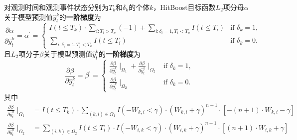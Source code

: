 \begin{theorem}\label{thm:1.3}
对观测时间和观测事件状态分别为$T_k$和$\delta_k$的个体$k$，HitBoost目标函数$L_2$项分母$\alpha$关于模型预测值$\hat{y}_t^k$的\textbf{一阶梯度}为$$
\frac{\partial \alpha}{\partial \hat{y}_t^k}=\alpha^{'}=
\begin{cases}
I(t\le T_k)\cdot {\sum\limits_{i: T_i>T_k}(-1)} + \sum\limits_{i: \delta_i=1,T_i<T_k} I(t\le T_i) & \text{if } \delta_k = 1,\\
\sum\limits_{i: \delta_i=1,T_i<T_k} I(t\le T_i) & \text{if } \delta_k = 0.
\end{cases}
$$ 且$L_2$项分子$\beta$关于模型预测值$\hat{y}_t^k$的\textbf{一阶梯度}为$$
\frac{\partial \beta}{\partial \hat{y}_t^k}=\beta^{'}=
\begin{cases}
\frac{\partial \beta}{\partial \hat{y}_t^k} \mid_{\Omega_1} + \frac{\partial \beta}{\partial \hat{y}_t^k} \mid_{\Omega_2} & \text{if } \delta_k = 1,\\
\frac{\partial \beta}{\partial \hat{y}_t^k} \mid_{\Omega_2} & \text{if } \delta_k = 0.
\end{cases}
$$ 其中\[
\begin{split}
\frac{\partial \beta}{\partial \hat{y}_t^k} \mid_{\Omega_1} &= I(t\le T_k)\cdot \sum\limits_{(k,i)\in \Omega_1} {I(-W_{k,i}<\gamma)\cdot (W_{k,i}+\gamma)^{n-1}\cdot [-(n+1)\cdot W_{k,i}-\gamma]} \\
\frac{\partial \beta}{\partial \hat{y}_t^k} \mid_{\Omega_2} &= \sum\limits_{(i,k)\in \Omega_2} {I(t\le T_i)\cdot I(-W_{i,k}<\gamma)\cdot (W_{i,k}+\gamma)^{n-1}\cdot [(n+1)\cdot W_{i,k}+\gamma]}
\end{split}
\]
\end{theorem}


